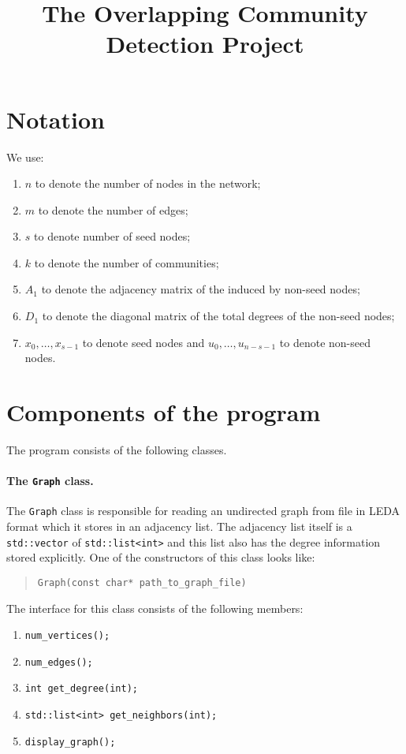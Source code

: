 \documentclass[12pt]{article}
\title{The Overlapping Community Detection Project}
\begin{document}
\maketitle

\section{Notation} 
We use: 
\begin{enumerate}
	\item $n$ to denote the number of nodes in the network;
	\item $m$ to denote the number of edges;
	\item $s$ to denote number of seed nodes;	
	\item $k$ to denote the number of communities;
	\item $A_1$ to denote the adjacency matrix of the induced by non-seed nodes;
	\item $D_1$ to denote the diagonal matrix of the total degrees of the non-seed nodes;
	\item $x_0, \ldots, x_{s-1}$ to denote seed nodes and $u_0, \ldots, u_{n - s -1}$ 
			to denote non-seed nodes. 
\end{enumerate}

\section{Components of the program}

The program consists of the following classes.
\paragraph{The \texttt{Graph} class.} The \verb|Graph| class 
is responsible for reading an undirected graph from file 
in LEDA format which it stores in an adjacency list. 
The adjacency list itself is a \verb|std::vector| 
of \verb|std::list<int>| and this list also has the degree 
information stored explicitly. One of the constructors of this class looks like:
\begin{quote}
\verb|Graph(const char* path_to_graph_file)| 
\end{quote}

The interface for this class consists of the following members: 
\begin{enumerate}
	\item \verb|num_vertices();|
	\item \verb|num_edges();| 
	\item \verb|int get_degree(int);|
	\item \verb|std::list<int> get_neighbors(int);|
	\item \verb|display_graph();|
	\end{enumerate}
\end{document}
